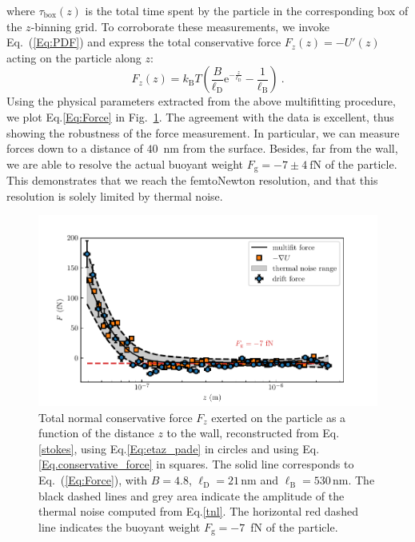 where $\tau_{\textrm{box}}(z)$ is the total time spent by the particle in the corresponding box of the $z$-binning grid. To corroborate these measurements, we invoke Eq.~(\ref{Eq:PDF}) and express the total conservative force $F_z(z)=-U'(z)$ acting on the particle along $z$:
\begin{equation}
	\displaystyle F_z(z) =  k_{\mathrm{B}}T\left(\frac{B}{\ell_\mathrm{D}} \textrm{e}^{-\frac{z}{\ell_\mathrm{D}}} - \frac{1}{\ell_\mathrm{B}}\right)\ .
	\label{Eq:Force}
\end{equation} 
Using the physical parameters extracted from the above multifitting procedure, we plot Eq.\ref{Eq:Force} in Fig.~\ref{fig.figure_force_total}. The agreement with the data is excellent, thus showing the robustness of the force measurement. In particular, we can measure forces down to a distance of $40$~nm from the surface. Besides, far from the wall, we are able to resolve the actual buoyant weight $F_{\textrm{g}} =- 7  \pm 4 ~ \mathrm{fN}$ of the particle. This demonstrates that we reach the femtoNewton resolution, and that this resolution is solely limited by thermal noise.
 \begin{figure}[H]
	\centering
	\includegraphics{02_body/chapter3/images/trajctory_analysis/figure_force_total.pdf}
	\caption{Total normal conservative force $F_z$ exerted on the particle as a function of the distance $z$ to the wall, reconstructed from Eq.\ref{stokes}, using Eq.\ref{Eq:etaz_pade} in circles and using Eq.\ref{Eq.conservative_force} in squares. The solid line corresponds to Eq.~(\ref{Eq:Force}), with $B=4.8$, $\ell_{\mathrm{D}}=21\,\mathrm{nm}$ and $\ell_{\mathrm{B}}=530\,\mathrm{nm}$. The black dashed lines and grey area indicate the amplitude of the thermal noise computed from Eq.\ref{tnl}. The horizontal red dashed line indicates the buoyant weight $F_{\textrm{g}}=-7$~fN of the particle.}
	\label{fig.figure_force_total}
\end{figure}

